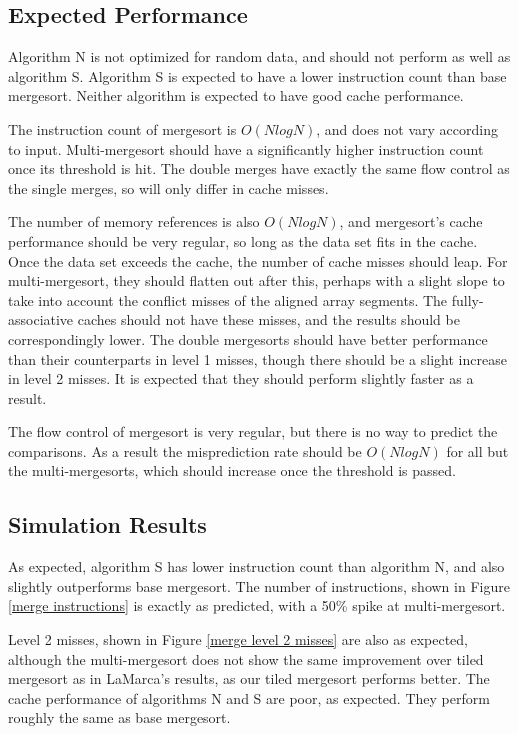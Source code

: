\subsection{Expected Performance}

Algorithm N is not optimized for random data, and should not perform as well as
algorithm S. Algorithm S is expected to have a lower instruction count than base
mergesort. Neither algorithm is expected to have good cache performance.


The instruction count of mergesort is $O(NlogN)$, and does not vary
according to input. Multi-mergesort should have a significantly higher
instruction count once its threshold is hit. The double merges have exactly the
same flow control as the single merges, so will only differ in cache misses.

The number of memory references is also $O(NlogN)$, and mergesort's cache
performance should be very regular, so long as the data set fits in the cache. Once
the data set exceeds the cache, the number of cache misses should leap. For
multi-mergesort, they should flatten out after this, perhaps with a slight
slope to take into account the conflict misses of the aligned array segments. The
fully-associative caches should not have these misses, and the results should be
correspondingly lower. The double mergesorts should have
better performance than their counterparts in level 1 misses, though there
should be a slight increase in level 2 misses. It is expected that they should
perform slightly faster as a result.

The flow control of mergesort is very regular, but there is no way to predict
the comparisons. As a result the misprediction rate should be $O(NlogN)$ for
all but the multi-mergesorts, which should increase once the threshold is
passed.

\subsection{Simulation Results}
\label{Mergesort results}


As expected, algorithm S has lower instruction count than algorithm N, and 
also slightly outperforms base mergesort. The number of instructions, shown in
Figure \ref{merge instructions} is exactly as predicted, with a 50\% spike at
multi-mergesort. 

Level 2 misses, shown in Figure \ref{merge level 2 misses} are
also as expected, although the multi-mergesort does not show the same
improvement over tiled mergesort as in LaMarca's results, as our tiled mergesort
performs better. The cache performance of algorithms N and S are poor, as
expected. They perform roughly the same as base mergesort.

